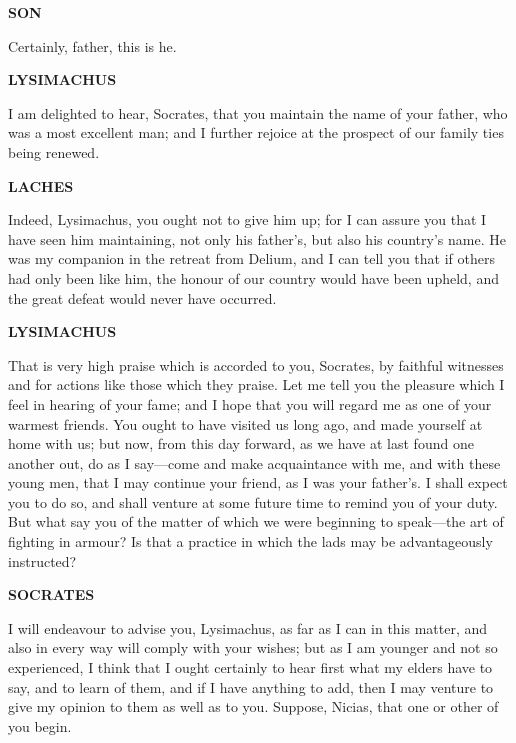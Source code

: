 \documentclass[11pt,letter]{article}
\begin{document}
\par \textbf{SON}
\par   Certainly, father, this is he.

\par \textbf{LYSIMACHUS}
\par   I am delighted to hear, Socrates, that you maintain the name of your father, who was a most excellent man; and I further rejoice at the prospect of our family ties being renewed.

\par \textbf{LACHES}
\par   Indeed, Lysimachus, you ought not to give him up; for I can assure you that I have seen him maintaining, not only his father's, but also his country's name. He was my companion in the retreat from Delium, and I can tell you that if others had only been like him, the honour of our country would have been upheld, and the great defeat would never have occurred.

\par \textbf{LYSIMACHUS}
\par   That is very high praise which is accorded to you, Socrates, by faithful witnesses and for actions like those which they praise. Let me tell you the pleasure which I feel in hearing of your fame; and I hope that you will regard me as one of your warmest friends. You ought to have visited us long ago, and made yourself at home with us; but now, from this day forward, as we have at last found one another out, do as I say—come and make acquaintance with me, and with these young men, that I may continue your friend, as I was your father's. I shall expect you to do so, and shall venture at some future time to remind you of your duty. But what say you of the matter of which we were beginning to speak—the art of fighting in armour? Is that a practice in which the lads may be advantageously instructed?

\par \textbf{SOCRATES}
\par   I will endeavour to advise you, Lysimachus, as far as I can in this matter, and also in every way will comply with your wishes; but as I am younger and not so experienced, I think that I ought certainly to hear first what my elders have to say, and to learn of them, and if I have anything to add, then I may venture to give my opinion to them as well as to you. Suppose, Nicias, that one or other of you begin.
\end{document}
